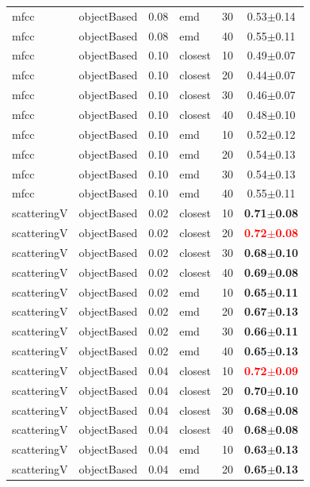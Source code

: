\begin{table}
\begin{center}
\begin{tabular}{lllllc}
mfcc & objectBased & 0.08 & emd & 30 & 0.53$\pm$0.14 \\ 
mfcc & objectBased & 0.08 & emd & 40 & 0.55$\pm$0.11 \\ 
mfcc & objectBased & 0.10 & closest & 10 & 0.49$\pm$0.07 \\ 
mfcc & objectBased & 0.10 & closest & 20 & 0.44$\pm$0.07 \\ 
mfcc & objectBased & 0.10 & closest & 30 & 0.46$\pm$0.07 \\ 
mfcc & objectBased & 0.10 & closest & 40 & 0.48$\pm$0.10 \\ 
mfcc & objectBased & 0.10 & emd & 10 & 0.52$\pm$0.12 \\ 
mfcc & objectBased & 0.10 & emd & 20 & 0.54$\pm$0.13 \\ 
mfcc & objectBased & 0.10 & emd & 30 & 0.54$\pm$0.13 \\ 
mfcc & objectBased & 0.10 & emd & 40 & 0.55$\pm$0.11 \\ 
scatteringV & objectBased & 0.02 & closest & 10 & \textbf{0.71$\pm$0.08} \\ 
scatteringV & objectBased & 0.02 & closest & 20 & \textbf{\textcolor{red}{0.72$\pm$0.08}} \\ 
scatteringV & objectBased & 0.02 & closest & 30 & \textbf{0.68$\pm$0.10} \\ 
scatteringV & objectBased & 0.02 & closest & 40 & \textbf{0.69$\pm$0.08} \\ 
scatteringV & objectBased & 0.02 & emd & 10 & \textbf{0.65$\pm$0.11} \\ 
scatteringV & objectBased & 0.02 & emd & 20 & \textbf{0.67$\pm$0.13} \\ 
scatteringV & objectBased & 0.02 & emd & 30 & \textbf{0.66$\pm$0.11} \\ 
scatteringV & objectBased & 0.02 & emd & 40 & \textbf{0.65$\pm$0.13} \\ 
scatteringV & objectBased & 0.04 & closest & 10 & \textbf{\textcolor{red}{0.72$\pm$0.09}} \\ 
scatteringV & objectBased & 0.04 & closest & 20 & \textbf{0.70$\pm$0.10} \\ 
scatteringV & objectBased & 0.04 & closest & 30 & \textbf{0.68$\pm$0.08} \\ 
scatteringV & objectBased & 0.04 & closest & 40 & \textbf{0.68$\pm$0.08} \\ 
scatteringV & objectBased & 0.04 & emd & 10 & \textbf{0.63$\pm$0.13} \\ 
scatteringV & objectBased & 0.04 & emd & 20 & \textbf{0.65$\pm$0.13} \\ 

\end{tabular}
\end{center}
\end{table}
